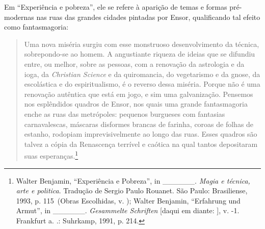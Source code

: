 Em ``Experiência e pobreza'', ele se refere à aparição de temas e formas
pré-modernas nas ruas das grandes cidades pintadas por Ensor,
qualificando tal efeito como fantasmagoria:

\begin{quote}
Uma nova miséria surgiu com esse monstruoso desenvolvimento da técnica,
sobrepondo-se ao homem. A angustiante riqueza de ideias que se difundiu
entre, ou melhor, sobre as pessoas, com a renovação da astrologia e da
ioga, da \emph{Christian Science} e da quiromancia, do vegetarismo e da
gnose, da escolástica e do espiritualismo, é o reverso dessa miséria.
Porque não é uma renovação autêntica que está em jogo, e sim uma
galvanização. Pensemos nos esplêndidos quadros de Ensor, nos quais uma
grande fantasmagoria enche as ruas das metrópoles: pequenos burgueses
com fantasias carnavalescas, máscaras disformes brancas de farinha,
coroas de folhas de estanho, rodopiam imprevisivelmente ao longo das
ruas. Esses quadros são talvez a cópia da Renascença terrível e caótica
na qual tantos depositaram suas esperanças.\footnote{Walter Benjamin,
  ``Experiência e Pobreza'', in \_\_\_\_\_\_. \emph{Magia e técnica,
  arte e politica}. Tradução de Sergio Paulo Rouanet. São Paulo:
  Brasiliense, 1993, p. 115~(Obras Escolhidas, v. ); Walter Benjamin,
  ``Erfahrung und Armut'', in \_\_\_\_\_\_. \emph{Gesammelte Schriften}
  [daqui em diante: ], v. -1. Frankfurt a. .: Suhrkamp, 1991,
  p. 214.}
\end{quote}

